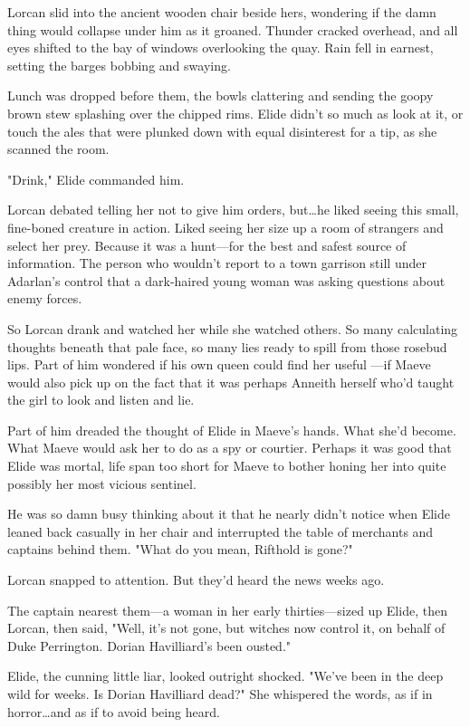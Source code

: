 Lorcan slid into the ancient wooden chair beside hers, wondering if the damn thing would collapse under him as it groaned.
Thunder cracked overhead, and all eyes shifted to the bay of windows overlooking the quay.
Rain fell in earnest, setting the barges bobbing and swaying.

Lunch was dropped before them, the bowls clattering and sending the goopy brown stew splashing over the chipped rims.
Elide didn't so much as look at it, or touch the ales that were plunked down with equal disinterest for a tip, as she scanned the room.

"Drink," Elide commanded him.

Lorcan debated telling her not to give him orders, but\ldots he liked seeing this small, fine-boned creature in action.
Liked seeing her size up a room of strangers and select her prey.
Because it was a hunt---for the best and safest source of information.
The person who wouldn't report to a town garrison still under Adarlan's control that a dark-haired young woman was asking questions about enemy forces.

So Lorcan drank and watched her while she watched others.
So many calculating thoughts beneath that pale face, so many lies ready to spill from those rosebud lips.
Part of him wondered if his own queen could find her useful ---if Maeve would also pick up on the fact that it was perhaps Anneith herself who'd taught the girl to look and listen and lie.

Part of him dreaded the thought of Elide in Maeve's hands.
What she'd become.
What Maeve would ask her to do as a spy or courtier.
Perhaps it was good that Elide was mortal, life span too short for Maeve to bother honing her into quite possibly her most vicious sentinel.

He was so damn busy thinking about it that he nearly didn't notice when Elide leaned back casually in her chair and interrupted the table of merchants and captains behind them.
"What do you mean, Rifthold is gone?"

Lorcan snapped to attention.
But they'd heard the news weeks ago.

The captain nearest them---a woman in her early thirties---sized up Elide, then Lorcan, then said, "Well, it's not gone, but 
witches now control it, on behalf of Duke Perrington.
Dorian Havilliard's been ousted."

Elide, the cunning little liar, looked outright shocked.
"We've been in the deep wild for weeks.
Is Dorian Havilliard dead?"
She whispered the words, as if in horror\ldots and as if to avoid being heard.


